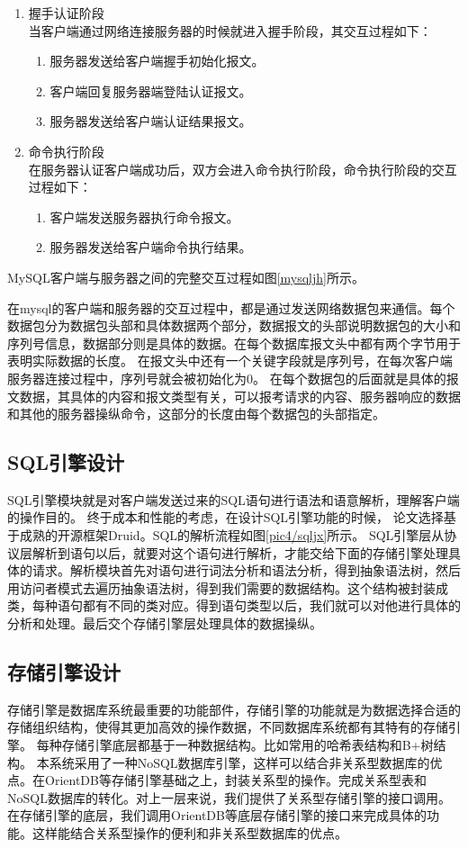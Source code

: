 \begin{enumerate}[fullwidth,itemindent=2em,listparindent=2em]
	\item 握手认证阶段\\
	当客户端通过网络连接服务器的时候就进入握手阶段，其交互过程如下：
	\begin{enumerate}
		\item 服务器发送给客户端握手初始化报文。
		\item 客户端回复服务器端登陆认证报文。
		\item 服务器发送给客户端认证结果报文。
	\end{enumerate}
	\item 命令执行阶段\\
	在服务器认证客户端成功后，双方会进入命令执行阶段，命令执行阶段的交互过程如下：
	\begin{enumerate}
		\item 	客户端发送服务器执行命令报文。
		\item 服务器发送给客户端命令执行结果。
	\end{enumerate}
\end{enumerate}

MySQL客户端与服务器之间的完整交互过程如图\ref{mysqljh}所示。

在mysql的客户端和服务器的交互过程中，都是通过发送网络数据包来通信。每个数据包分为数据包头部和具体数据两个部分，数据报文的头部说明数据包的大小和序列号信息，数据部分则是具体的数据。在每个数据库报文头中都有两个字节用于表明实际数据的长度。
在报文头中还有一个关键字段就是序列号，在每次客户端服务器连接过程中，序列号就会被初始化为0。
在每个数据包的后面就是具体的报文数据，其具体的内容和报文类型有关，可以报考请求的内容、服务器响应的数据和其他的服务器操纵命令，这部分的长度由每个数据包的头部指定。
\subsection{SQL引擎设计}
SQL引擎模块就是对客户端发送过来的SQL语句进行语法和语意解析，理解客户端的操作目的。
终于成本和性能的考虑，在设计SQL引擎功能的时候，
论文选择基于成熟的开源框架Druid。SQL的解析流程如图\ref{pic4/sqljx}所示。
SQL引擎层从协议层解析到语句以后，就要对这个语句进行解析，才能交给下面的存储引擎处理具体的请求。解析模块首先对语句进行词法分析和语法分析，得到抽象语法树，然后用访问者模式去遍历抽象语法树，得到我们需要的数据结构。这个结构被封装成类，每种语句都有不同的类对应。得到语句类型以后，我们就可以对他进行具体的分析和处理。最后交个存储引擎层处理具体的数据操纵。
\subsection{存储引擎设计}
存储引擎是数据库系统最重要的功能部件，存储引擎的功能就是为数据选择合适的存储组织结构，使得其更加高效的操作数据，不同数据库系统都有其特有的存储引擎。
每种存储引擎底层都基于一种数据结构。比如常用的哈希表结构和B+树结构。
本系统采用了一种NoSQL数据库引擎，这样可以结合非关系型数据库的优点。在OrientDB等存储引擎基础之上，封装关系型的操作。完成关系型表和NoSQL数据库的转化。对上一层来说，我们提供了关系型存储引擎的接口调用。在存储引擎的底层，我们调用OrientDB等底层存储引擎的接口来完成具体的功能。这样能结合关系型操作的便利和非关系型数据库的优点。
